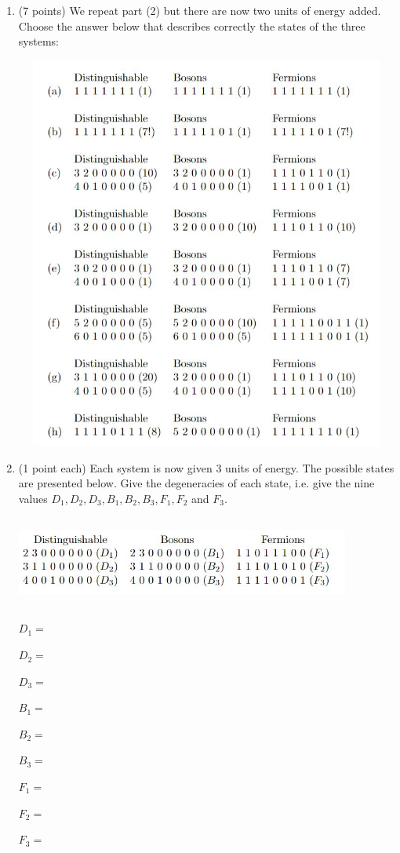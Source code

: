 \documentclass[fleqn]{article}
\begin{document}
\begin{enumerate}
    \pagebreak

    \item (7 points) We repeat part (2) but there are now two units of energy added. Choose the answer
    below that describes correctly the states of the three systems:
    \begin{center}
      \includegraphics[height=13cm, width=16cm]{3.JPG}
    \end{center}

    \pagebreak

    \item (1 point each) Each system is now given $3$ units of energy. The possible states are presented
    below. Give the degeneracies of each state, i.e. give the nine values $D_1, D_2, D_3, B_1, B_2, B_3,
    F_1, F_2$ and $F_3$.
    \begin{center}
      \includegraphics[height=3cm, width=11cm]{4.JPG}
    \end{center}

    $
      D_1=
    $

    $
      D_2=
    $

    $
      D_3=
    $

    $
      B_1=
    $

    $
      B_2=
    $

    $
      B_3=
    $

    $
      F_1=
    $

    $
      F_2=
    $

    $
      F_3=
    $
    
  \end{enumerate}
\end{document}
